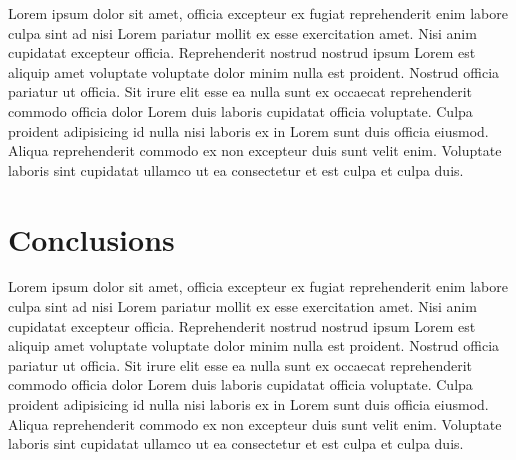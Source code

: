 \documentclass[11pt]{report}
\begin{document}
Lorem ipsum dolor sit amet, officia excepteur ex fugiat reprehenderit enim labore culpa sint ad nisi
Lorem pariatur mollit ex esse exercitation amet. Nisi anim cupidatat excepteur officia.
Reprehenderit nostrud nostrud ipsum Lorem est aliquip amet voluptate voluptate dolor minim nulla est
proident. Nostrud officia pariatur ut officia. Sit irure elit esse ea nulla sunt ex occaecat
reprehenderit commodo officia dolor Lorem duis laboris cupidatat officia voluptate. Culpa proident
adipisicing id nulla nisi laboris ex in Lorem sunt duis officia eiusmod. Aliqua reprehenderit
commodo ex non excepteur duis sunt velit enim. Voluptate laboris sint cupidatat ullamco ut ea
consectetur et est culpa et culpa duis.

\section*{Conclusions}
Lorem ipsum dolor sit amet, officia excepteur ex fugiat reprehenderit enim labore culpa sint ad nisi
Lorem pariatur mollit ex esse exercitation amet. Nisi anim cupidatat excepteur officia.
Reprehenderit nostrud nostrud ipsum Lorem est aliquip amet voluptate voluptate dolor minim nulla est
proident. Nostrud officia pariatur ut officia. Sit irure elit esse ea nulla sunt ex occaecat
reprehenderit commodo officia dolor Lorem duis laboris cupidatat officia voluptate. Culpa proident
adipisicing id nulla nisi laboris ex in Lorem sunt duis officia eiusmod. Aliqua reprehenderit
commodo ex non excepteur duis sunt velit enim. Voluptate laboris sint cupidatat ullamco ut ea
consectetur et est culpa et culpa duis.

% 
% 
% 
% 
% 
% 
\end{document}
